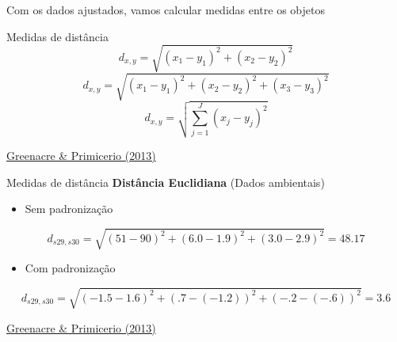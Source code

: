 \documentclass[
  ignorenonframetext,
]{beamer}
\providecommand{\tightlist}{%
  \setlength{\itemsep}{0pt}\setlength{\parskip}{0pt}}\usepackage{longtable,booktabs,array}
\begin{document}
\begin{frame}{Com os dados ajustados, vamos calcular medidas entre os
objetos}
\begin{block}{Medidas de distância}
\[d_{x,y} = \sqrt{(x_1 - y_1)^2 + (x_2 - y_2)^2}\]
\[d_{x,y} = \sqrt{(x_1 - y_1)^2 + (x_2 - y_2)^2 + (x_3 - y_3)^2}\]
\[d_{x,y} = \sqrt{\sum_{j=1}^{J}(x_j - y_j)^2}\]

\href{https://www.fbbva.es/microsite/multivariate-statistics/}{Greenacre
\& Primicerio (2013)}
\end{block}

\begin{block}{Medidas de distância}
\protect\hypertarget{medidas-de-distuxe2ncia-4}{}
\textbf{Distância Euclidiana} (Dados ambientais)

\begin{itemize}
\tightlist
\item
  Sem padronização
\end{itemize}

\[d_{s29,s30} = \sqrt{(51 - 90)^2 + (6.0 - 1.9)^2 + (3.0 - 2.9)^2} = 48.17\]

\begin{itemize}
\tightlist
\item
  Com padronização
\end{itemize}

\[d_{s29,s30} = \sqrt{(-1.5 - 1.6)^2 + (.7 - (-1.2))^2 + (-.2 - (-.6))^2} = 3.6\]

\href{https://www.fbbva.es/microsite/multivariate-statistics/}{Greenacre
\& Primicerio (2013)}
\end{block}
\end{frame}
\end{document}

